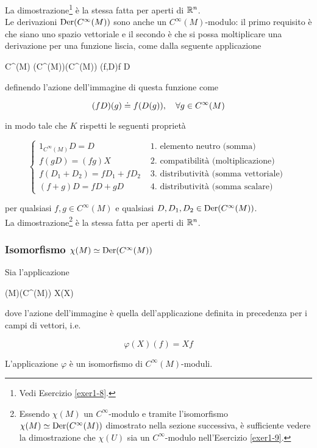 La dimostrazione\footnote{%
	Vedi Esercizio \ref{exer1-8}.%
} è la stessa fatta per aperti di $ \mathbb{R}^{n} $. \\
Le derivazioni $ \operatorname{Der}(C^{\infty}(M)) $ sono anche un $ C^{\infty}(M) $-modulo: il primo requisito è che siano uno spazio vettoriale e il secondo è che si possa moltiplicare una derivazione per una funzione liscia, come dalla seguente applicazione

	{C^{\infty}(M) \times \der(C^{\infty}(M))}{\der(C^{\infty}(M))}
	{(f,D)}{f D}

definendo l'azione dell'immagine di questa funzione come

\begin{equation}
	(f D)(g) \doteq f (D(g)) \qcomma \forall g \in C^{\infty}(M)
\end{equation}

in modo tale che $ K $ rispetti le seguenti proprietà

\begin{equation}
	\begin{cases}
		1_{C^{\infty}(M)} D = D & \text{ 1. elemento neutro (somma) } \\
		f (g D) = (f g) X & \text{ 2. compatibilità (moltiplicazione) } \\
		f (D_{1} + D_{2}) = f D_{1} + f D_{2} & \text{ 3. distributività (somma vettoriale) } \\
		(f + g) D = f D + g D & \text{ 4. distributività (somma scalare) }
	\end{cases}
\end{equation}

per qualsiasi $ f,g \in C^{\infty}(M) $ e qualsiasi $ D,D_{1},D_{2} \in \operatorname{Der}(C^{\infty}(M)) $. \\
La dimostrazione\footnote{%
	Essendo $ \chi(M) $ un $ C^{\infty} $-modulo e tramite l'isomorfismo $ \chi(M) \simeq \operatorname{Der}(C^{\infty}(M)) $ dimostrato nella sezione successiva, è sufficiente vedere la dimostrazione che $ \chi(U) $ sia un $ C^{\infty} $-modulo nell'Esercizio \ref{exer1-9}.%
} è la stessa fatta per aperti di $ \mathbb{R}^{n} $.

\subsubsection{Isomorfismo $ \chi(M) \simeq \operatorname{Der}(C^{\infty}(M)) $}\label{ss-sec:iso-chi-der-man}

\begin{theorem}
	Sia l'applicazione
	
	\map{\varphi}
		{\chi(M)}{\der(C^{\infty}(M))}
		{X}{\varphi(X)}

	dove l'azione dell'immagine è quella dell'applicazione definita in precedenza per i campi di vettori, i.e.
	
	\begin{equation}
		\varphi(X)(f) = X f
	\end{equation}

	L'applicazione $ \varphi $ è un isomorfismo di $ C^{\infty}(M) $-moduli.
\end{theorem}

